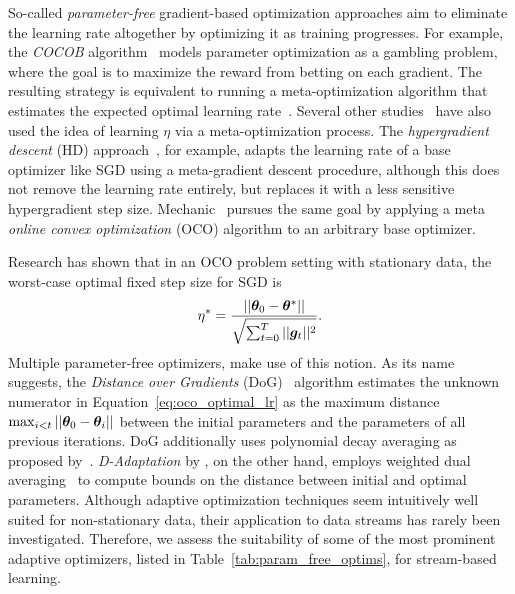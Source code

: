 \documentclass{article} %
\begin{document}

So-called \textit{parameter-free} gradient-based optimization approaches aim to eliminate the learning rate altogether by optimizing it as training progresses.
For example, the \textit{COCOB} algorithm~\citep{orabonaTrainingDeepNetworks2017} models parameter optimization as a gambling problem, where the goal is to maximize the reward from betting on each gradient.
The resulting strategy is equivalent to running a meta-optimization algorithm that estimates the expected optimal learning rate~\citep{orabonaTrainingDeepNetworks2017}.
Several other studies~\citep{vanervenMetaGradMultipleLearning2016a,baydinOnlineLearningRate2018,cutkoskyMechanicLearningRate2023} have also used the idea of learning $\eta$ via a meta-optimization process.
The \textit{hypergradient descent} (HD) approach~\citep{baydinOnlineLearningRate2018}, for example, adapts the learning rate of a base optimizer like SGD using a meta-gradient descent procedure, although this does not remove the learning rate entirely, but replaces it with a less sensitive hypergradient step size.
Mechanic~\citep{cutkoskyMechanicLearningRate2023} pursues the same goal by applying a meta \textit{online convex optimization} (OCO) algorithm to an arbitrary base optimizer.

Research has shown that in an OCO problem setting with stationary data, the worst-case optimal fixed step size for SGD is
\begin{equation}\label{eq:oco_optimal_lr}
   \eta^* = \frac{||{\bm{\theta}}_0 - {\bm{\theta}}^*||}{\sqrt{\sum_{t=0}^{T} ||{\bm{g}}_t||^2}}.
\end{equation}
Multiple parameter-free optimizers, make use of this notion.
As its name suggests, the \textit{Distance over Gradients} (DoG)~\citep{ivgiDoGSGDBest2023} algorithm estimates the unknown numerator in Equation~\eqref{eq:oco_optimal_lr} as the maximum distance $\max_{i<t}||{\bm{\theta}}_0 - {\bm{\theta}}_i||$ between the initial parameters and the parameters of all previous iterations.
DoG additionally uses polynomial decay averaging as proposed by~\citet{shamirStochasticGradientDescent2012}.
\textit{D-Adaptation} by \citet{defazioLearningRateFreeLearningDAdaptation2023a}, on the other hand, employs weighted dual averaging~\citep{duchiDualAveragingDistributed2012} to compute bounds on the distance between initial and optimal parameters.
Although adaptive optimization techniques seem intuitively well suited for non-stationary data, their application to data streams has rarely been investigated.
Therefore, we assess the suitability of some of the most prominent adaptive optimizers, listed in Table~\ref{tab:param_free_optims}, for stream-based learning.
\end{document}
